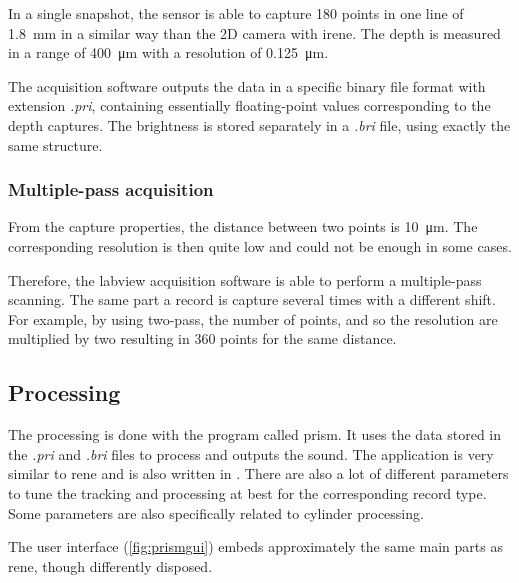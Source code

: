 In a single snapshot, the sensor is able to capture 180 points in one line of \SI{1.8}{\milli\metre} in a similar way than the 2D camera with \gls{irene}. The depth is measured in a range of \SI{400}{\micro\metre} with a resolution of \SI{0.125}{\micro\metre}.

The acquisition software outputs the data in a specific binary file format with extension \emph{.pri}, containing essentially floating-point values corresponding to the depth captures. The brightness is stored separately in a \emph{.bri} file, using exactly the same structure.

\subsubsection{Multiple-pass acquisition}

From the capture properties, the distance between two points is \SI{10}{\micro\metre}. The corresponding resolution is then quite low and could not be enough in some cases.

Therefore, the \gls{labview} acquisition software is able to perform a multiple-pass scanning. The same part a record is capture several times with a different shift. For example, by using two-pass, the number of points, and so the resolution are multiplied by two resulting in 360 points for the same distance.

\subsection{Processing}

The processing is done with the program called \gls{prism}. It uses the data stored in the \emph{.pri} and \emph{.bri} files to process and outputs the sound. The application is very similar to \gls{rene} and is also written in \Csh. There are also a lot of different parameters to tune the tracking and processing at best for the corresponding record type. Some parameters are also specifically related to cylinder processing.

The user interface (\autoref{fig:prismgui}) embeds approximately the same main parts as \gls{rene}, though differently disposed.

